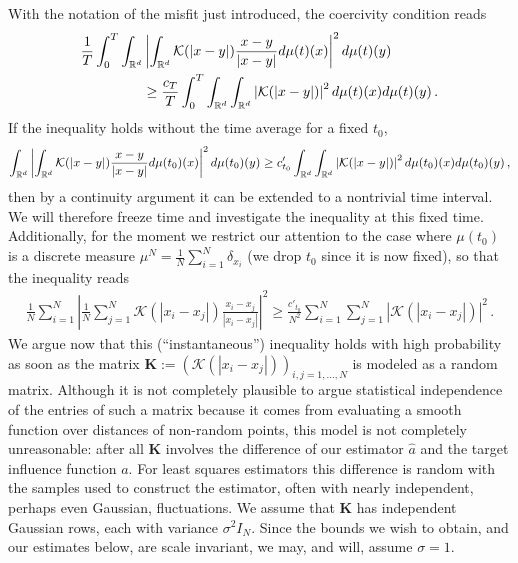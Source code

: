 With the notation of the misfit just introduced, the coercivity condition reads
\begin{align*}
\frac1T\int_0^T\int_{\mathbb{R}^d}&\left|\int_{\mathbb{R}^d} \mathcal K(|x-y|)\frac{x-y}{|x-y|}d\mu(t)(x)\right|^2d\mu(t)(y) \\
&\ge\frac{c_T}{T}\int_0^T\int_{\mathbb{R}^d}\int_{\mathbb{R}^d}\left| \mathcal K(|x-y|)\right|^2d\mu(t)(x)d\mu(t)(y)\,.
\end{align*}
If the inequality holds without the time average for a fixed $t_0$,
\begin{align*}
\int_{\mathbb{R}^d}\left|\int_{\mathbb{R}^d} \mathcal K(|x-y|)\frac{x-y}{|x-y|}d\mu(t_0)(x)\right|^2d\mu(t_0)(y)
\ge c_{t_0}'\int_{\mathbb{R}^d}\int_{\mathbb{R}^d}\left| \mathcal K(|x-y|)\right|^2d\mu(t_0)(x)d\mu(t_0)(y)\,,
\end{align*}
then by a continuity argument it can be extended to a nontrivial time interval. We will therefore freeze time and investigate the inequality at this fixed time. 
Additionally, for the moment we restrict our attention to the case where $\mu(t_0)$ is a discrete measure $\mu^N=\frac1N\sum_{i=1}^N\delta_{x_i}$ (we drop $t_0$ since it is now fixed), so that the inequality reads
\begin{align}
\frac1N\sum_{i=1}^N\left|\frac{1}{N} \sum_{j=1}^N  \mathcal K(|x_i-x_j|)\frac{x_i-x_j}{|x_i-x_j|}\right|^2\ge \frac{c'_{t_0}}{N^2}\sum_{i=1}^N\sum_{j=1}^N\left| \mathcal K(|x_i-x_j|)\right|^2\,.
\label{e:coercivitydiscrete}
\end{align}
We argue now that this (``instantaneous'') inequality holds with high probability as soon as the matrix $\mathbf{K}:=(\mathcal K(|x_i-x_j|))_{i,j=1,\dots,N}$ is modeled as a random matrix.
Although it is not completely plausible to argue statistical independence of the entries of such a matrix because it comes from evaluating a smooth function over distances of non-random points, this model is not completely unreasonable: after all $\mathbf K$ involves the difference of our estimator $\widehat a$ and the target influence function $a$. For least squares estimators this difference is random with the samples used to construct the estimator, often with nearly independent, perhaps even Gaussian, fluctuations. 
We assume that $\mathbf K$ has independent Gaussian rows, each with variance $\sigma^2I_N$. %
Since the bounds we wish to obtain, and our estimates below, are scale invariant, we may, and will, assume $\sigma=1$.
